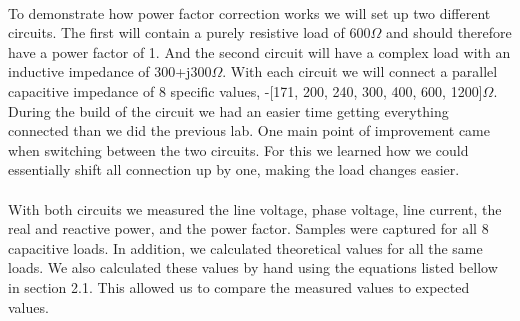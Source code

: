 \paragraph{}To demonstrate how power factor correction works we will
set up two different circuits.
The first will contain a purely resistive load of 600$\Omega$ and
should therefore have a power factor of 1.
And the second circuit will have a complex load with an inductive
impedance of 300+j300$\Omega$.
With each circuit we will connect a parallel capacitive impedance of
8 specific values, -[171, 200, 240, 300, 400, 600, 1200]$\Omega$.
During the build of the circuit we had an easier time getting
everything connected than we did  the previous lab. One main point of
improvement came when switching between the two circuits. For this we
learned how we could essentially shift all connection up by one,
making the load changes easier.

\paragraph{}With both circuits we measured the line voltage, phase
voltage, line current, the real and reactive power,
and the power factor. Samples were captured for all 8 capacitive
loads. In addition, we calculated theoretical
values for all the same loads. We also calculated these values by
hand using the equations listed bellow in section 2.1.
This allowed us to compare the measured values to expected values.

\clearpage
